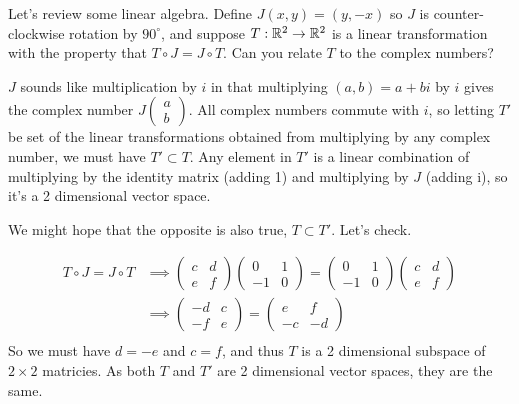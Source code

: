 \documentclass{homework}
\begin{document}
\begin{problem}
  Let's review some linear algebra.  Define $J(x,y) = (y,-x)$ so $J$
  is counter-clockwise rotation by $90^\circ$, and suppose
  $T : \mathbb{R}^2 \to \mathbb{R}^2$ is a linear transformation with the property
  that $T \circ J = J \circ T$.  Can you relate $T$ to the complex
  numbers?
\end{problem}
\begin{solution}
$J$ sounds like multiplication by $i$ in that multiplying $(a,b)=a+bi$ by $i$ gives the complex number $J\begin{pmatrix}a\\b\end{pmatrix}$. All complex numbers commute with $i$, so letting $T'$ be set of the linear transformations obtained from multiplying by any complex number, we must have $T'\subset T$. Any element in $T'$ is a linear combination of multiplying by the identity matrix (adding 1) and multiplying by $J$ (adding i), so it's a 2 dimensional vector space.

We might hope that the opposite is also true, $T\subset T'$. Let's check.

\begin{align*}
T\circ J = J \circ T& \implies \begin{pmatrix}c&d\\e&f\end{pmatrix} \begin{pmatrix}0&1\\-1&0\end{pmatrix} = \begin{pmatrix}0&1\\-1&0\end{pmatrix}  \begin{pmatrix}c&d\\e&f\end{pmatrix}\\
& \implies \begin{pmatrix}-d&c\\-f&e\end{pmatrix} = \begin{pmatrix}e&f\\-c&-d\end{pmatrix}\\
\end{align*}
So we must have $d=-e$ and $c=f$, and thus $T$ is a 2 dimensional subspace of $2\times 2$ matricies. As both $T$ and $T'$ are 2 dimensional vector spaces, they are the same.
\end{solution}
\end{document}
